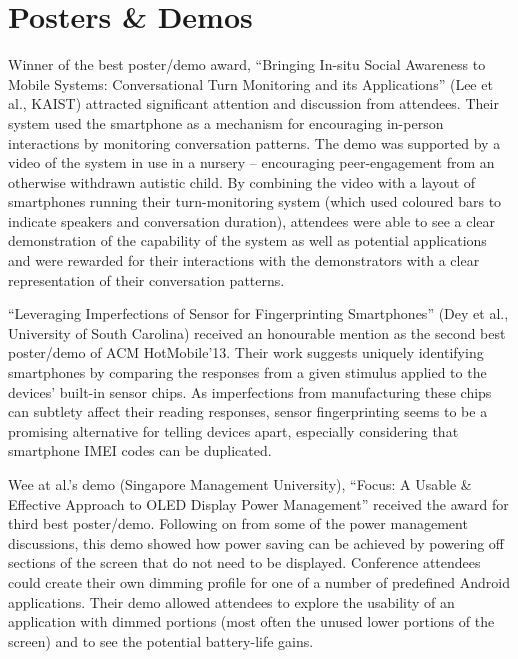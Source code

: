 \section{Posters \& Demos}
\label{sec:postersdemos}
Winner of the best poster\slash demo award, ``Bringing In-situ Social Awareness to Mobile 
Systems: Conversational Turn Monitoring and its Applications'' (Lee et al., 
KAIST) attracted significant attention and discussion from attendees. Their 
system used the smartphone as a mechanism for encouraging in-person interactions
by monitoring conversation patterns. The demo was supported by a video of the 
system in use in a nursery -- encouraging peer-engagement from an otherwise 
withdrawn autistic child. By combining the video with a layout of smartphones 
running their turn-monitoring system (which used coloured bars to indicate 
speakers and conversation duration), attendees were able to see a clear 
demonstration of the capability of the system as well as potential applications
and were rewarded for their interactions with the demonstrators with a clear
representation of their conversation patterns.

``Leveraging Imperfections of Sensor for Fingerprinting Smartphones''
(Dey et al., University of South Carolina) received an honourable mention
as the second best poster\slash demo of ACM HotMobile'13. Their work suggests
uniquely identifying smartphones by comparing the responses from a given
stimulus applied to the devices' built-in sensor chips. As imperfections
from manufacturing these chips can subtlety affect their reading
responses, sensor fingerprinting seems to be a promising alternative for
telling devices apart, especially considering that smartphone IMEI codes
can be duplicated.

Wee at al.'s demo (Singapore Management University), ``Focus: A Usable \&
Effective Approach to OLED Display Power Management'' received the award
for third best poster\slash demo. Following on from some of the power
management discussions, this demo showed how power saving can be achieved
by powering off sections of the screen that do not need to be displayed.
Conference attendees could create their own dimming profile for one of a
number of predefined Android applications. Their demo allowed attendees to
explore the usability of an application with dimmed portions (most often
the unused lower portions of the screen) and to see the potential
battery-life gains.